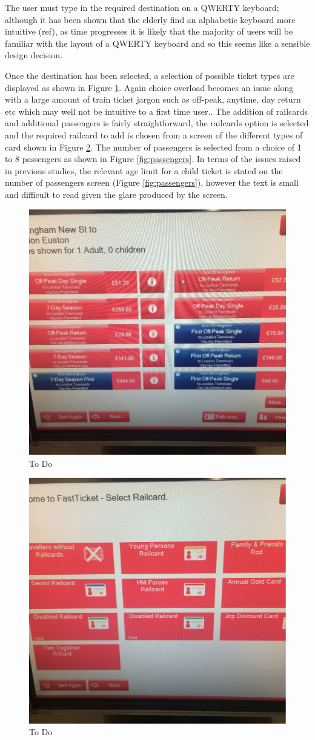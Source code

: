 The user must type in the required destination on a QWERTY keyboard; although it has been shown that the elderly find an alphabetic keyboard more intuitive (ref), as time progresses it is likely that the majority of users will be familiar with the layout of a QWERTY keyboard and so this seems like a sensible design decision.

Once the destination has been selected, a selection of possible ticket types are displayed as shown in Figure \ref{fig:peaks}.  Again choice overload becomes an issue along with a large amount of train ticket jargon such as off-peak, anytime, day return etc which may well not be intuitive to a first time user.. The addition of railcards and additional passengers is fairly straightforward, the railcards option is selected and the required railcard to add is chosen from a screen of the different types of card shown in Figure \ref{fig:railcard}. The number of passengers is selected from a choice of 1 to 8 passengers as shown in Figure \ref{fig:passengers}. In terms of the issues raised in previous studies, the relevant age limit for a child ticket is stated on the number of passengers screen (Figure \ref{fig:passengers}), however the text is small and difficult to read given the glare produced by the screen.

\begin{figure}[h!]
	\centering
	\includegraphics[width=0.5\linewidth, angle=0, origin=c]{images/image01}
	\caption{To Do}
	\label{fig:peaks}
\end{figure}

\begin{figure}[h!]
	\centering
	\includegraphics[width=0.5\linewidth, angle=0, origin=c]{images/image05}
	\caption{To Do}
	\label{fig:railcard}
\end{figure}

